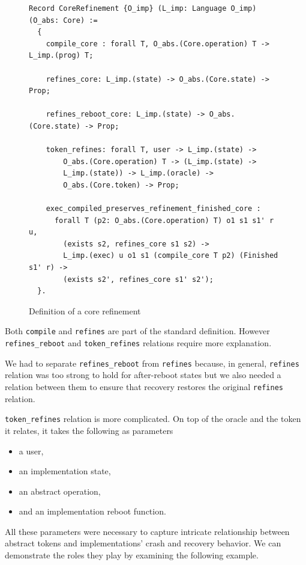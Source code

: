 \begin{figure}[ht]
    \centering
    \begin{verbatim}
Record CoreRefinement {O_imp} (L_imp: Language O_imp) (O_abs: Core) :=
  {
    compile_core : forall T, O_abs.(Core.operation) T -> L_imp.(prog) T;
    
    refines_core: L_imp.(state) -> O_abs.(Core.state) -> Prop;
    
    refines_reboot_core: L_imp.(state) -> O_abs.(Core.state) -> Prop;
    
    token_refines: forall T, user -> L_imp.(state) -> 
        O_abs.(Core.operation) T -> (L_imp.(state) -> 
        L_imp.(state)) -> L_imp.(oracle) -> 
        O_abs.(Core.token) -> Prop;
    
    exec_compiled_preserves_refinement_finished_core :
      forall T (p2: O_abs.(Core.operation) T) o1 s1 s1' r u,
        (exists s2, refines_core s1 s2) ->
        L_imp.(exec) u o1 s1 (compile_core T p2) (Finished s1' r) ->
        (exists s2', refines_core s1' s2');
  }.
    \end{verbatim}
    \caption{Definition of a core refinement}
    \label{fig:Core_Refinement_Definition}
\end{figure}

Both \texttt{compile} and \texttt{refines} are part of the standard definition. However \texttt{refines\_reboot} and \texttt{token\_refines} relations require more explanation.

We had to separate \texttt{refines\_reboot} from \texttt{refines} because, in general, \texttt{refines} relation was too strong to hold for after-reboot states but we also needed a relation between them to ensure that recovery restores the original \texttt{refines} relation.

\texttt{token\_refines} relation is more complicated. On top of the oracle and the token it relates, it takes the following as parameters
\begin{itemize}
    \item a user,
    \item an implementation state,
    \item an abstract operation,
    \item and an implementation reboot function.
\end{itemize}
All these parameters were necessary to capture intricate relationship between abstract tokens and implementations' crash and recovery behavior. We can demonstrate the roles they play by examining the following example.

